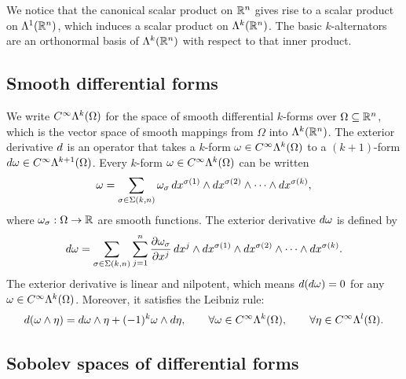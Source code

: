 \documentclass[10pt,letterpaper]{article}
\begin{document}
We notice that the canonical scalar product on ${\mathbb R}^{n}$ gives rise to a scalar product on $\Lambda^{1}({\mathbb R}^{n})$,
which induces a scalar product on $\Lambda^{k}({\mathbb R}^{n})$.
The basic $k$-alternators are an orthonormal basis of $\Lambda^{k}({\mathbb R}^{n})$ with respect to that inner product. 

\subsection{Smooth differential forms}

We write $C^{\infty}\Lambda^{k}(\Omega)$ for the space of smooth differential $k$-forms over $\Omega \subseteq {\mathbb R}^{n}$,
which is the vector space of smooth mappings from $\Omega$ into $\Lambda^{k}({\mathbb R}^{n})$.
The exterior derivative \( d \) is an operator that takes a \( k \)-form \( \omega \in C^{\infty}\Lambda^{k}(\Omega) \) 
to a \((k+1)\)-form \( d\omega \in C^{\infty}\Lambda^{k+1}(\Omega) \). 
Every \( k \)-form \( \omega \in C^{\infty}\Lambda^{k}(\Omega) \) can be written 
\begin{gather*}
    \omega = 
    \sum_{ \sigma \in \Sigma(k,n) } 
    \omega_{\sigma} \, 
    dx^{\sigma(1)} \wedge dx^{\sigma(2)} \wedge \cdots \wedge dx^{\sigma(k)},
\end{gather*}
where \( \omega_{\sigma} : \Omega \rightarrow {\mathbb R} \) are smooth functions.
The exterior derivative \( d\omega \) is defined by
\begin{gather*}
    d\omega = 
    \sum_{ \sigma \in \Sigma(k,n) } 
    \sum_{j=1}^{n} 
    \frac{\partial \omega_{\sigma}}{\partial x^j} 
    \, dx^j \wedge 
    dx^{\sigma(1)} \wedge dx^{\sigma(2)} \wedge \cdots \wedge dx^{\sigma(k)}.
\end{gather*}
The exterior derivative is linear and nilpotent, which means 
\( d(d\omega) = 0 \) for any \( \omega \in C^{\infty}\Lambda^{k}(\Omega) \).
Moreover, it satisfies the Leibniz rule:
\begin{gather*} 
    d(\omega \wedge \eta) 
    = 
    d\omega \wedge \eta + (-1)^{k} \omega \wedge d\eta, 
    \qquad \forall \omega \in C^{\infty}\Lambda^{k}(\Omega), 
    \qquad \forall \eta \in C^{\infty}\Lambda^{l}(\Omega).
\end{gather*}

\subsection{Sobolev spaces of differential forms}
\end{document}
